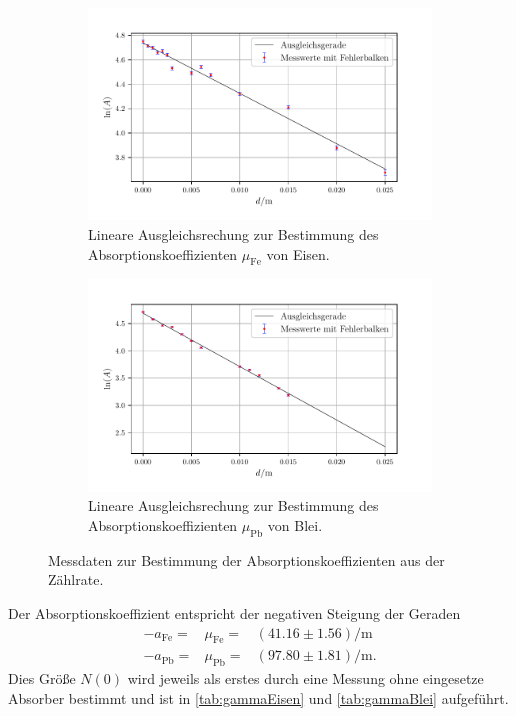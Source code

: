 \begin{figure}[H]
  \begin{subfigure}{\textwidth}
    \centering
    \includegraphics[scale=0.75]{build/plot1.pdf}
    \caption {Lineare Ausgleichsrechung zur Bestimmung des Absorptionskoeffizienten
    $\mu_{\text{Fe}}$ von Eisen.}
    \label{fig:plot1}
  \end{subfigure}
  \hfill
  \begin{subfigure}{\textwidth}
    \centering
    \includegraphics[scale=0.75]{build/plot2.pdf}
    \caption {Lineare Ausgleichsrechung zur Bestimmung des Absorptionskoeffizienten
    $\mu_{\text{Pb}}$ von Blei.}
    \label{fig:plot2}
  \end{subfigure}
    \caption {Messdaten zur Bestimmung der Absorptionskoeffizienten aus der Zählrate.}
  \end{figure}

Der Absorptionskoeffizient entspricht der negativen Steigung der Geraden
\begin{align}
  -a_{\text{Fe}} =& \mu_{\text{Fe}} =& (41.16 \pm 1.56) \si{\per\meter}\\
  -a_{\text{Pb}} =& \mu_{\text{Pb}} =& (97.80 \pm 1.81) \si{\per\meter}.
\end{align}
Dies Größe $N(0)$ wird jeweils als erstes durch eine Messung ohne eingesetze Absorber bestimmt und ist in \autoref{tab:gammaEisen}
und \autoref{tab:gammaBlei} aufgeführt.

